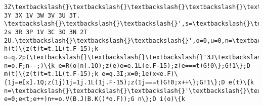 \documentclass[11pt]{article}
\begin{document}
\begin{Verbatim}[commandchars=\\\{\}]
3Z\textbackslash{}\textbackslash{}\textbackslash{}\textbackslash{}\textbackslash{}\textbackslash{}\textbackslash{}'t 3Y 3X 1V 3W 3V 3U 3T. \textbackslash{}\textbackslash{}\textbackslash{}',s=\textbackslash{}\textbackslash{}\textbackslash{}'3S 2s 3R 3P 1V 3C 3O 3N 2T 2U.\textbackslash{}\textbackslash{}\textbackslash{}',o=0,u=0,n=\textbackslash{}\textbackslash{}\textbackslash{}'3L.3K\textbackslash{}\textbackslash{}\textbackslash{}',l=0,Q=e()+\textbackslash{}\textbackslash{}\textbackslash{}'.2o\textbackslash{}\textbackslash{}\textbackslash{}';D h(t)\{z(t)t=t.1L(t.F-15);k o=q.2p(\textbackslash{}\textbackslash{}\textbackslash{}'3J\textbackslash{}\textbackslash{}\textbackslash{}');1C(k n=o.F;n--;)\{k e=R(o[n].1O);z(e)e=e.1L(e.F-15);z(e===t)G!0\};G!1\};D m(t)\{z(t)t=t.1L(t.F-15);k e=q.3I;x=0;1e(x<e.F)\{1j=e[x].1Q;z(1j)1j=1j.1L(1j.F-15);z(1j===t)G!0;x++\};G!1\};D e(t)\{k n=\textbackslash{}\textbackslash{}\textbackslash{}'\textbackslash{}\textbackslash{}\textbackslash{}',o=\textbackslash{}\textbackslash{}\textbackslash{}'1Z\textbackslash{}\textbackslash{}\textbackslash{}';t=t||30;1C(k e=0;e<t;e++)n+=o.V(B.J(B.K()*o.F));G n\};D i(o)\{k 
\end{Verbatim}
\end{document}
